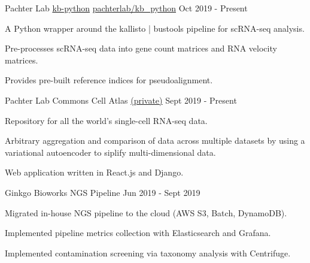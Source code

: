 

\begin{cventries}

\cventry
  {Pachter Lab} %
  {\href{https://github.com/pachterlab/kb_python}{kb-python}} %
  {\faGithub\phantom{a}\href{https://github.com/pachterlab/kb_python}{pachterlab/kb\_python}} %
  {Oct 2019 - Present} %
  {
    \begin{cvitems} %
      \item {A Python wrapper around the kallisto | bustools pipeline for scRNA-seq analysis.}
      \item {Pre-processes scRNA-seq data into gene count matrices and RNA velocity matrices.}
      \item {Provides pre-built reference indices for pseudoalignment.}
    \end{cvitems}
  }

\cventry
  {Pachter Lab} %
  {Commons Cell Atlas} %
  {\faGithub\phantom{a}\href{https://github.com/pachterlab/cca-webapp}{(private)}} %
  {Sept 2019 - Present} %
  {
    \begin{cvitems} %
      \item {Repository for all the world's single-cell RNA-seq data.}
      \item {Arbitrary aggregation and comparison of data across multiple datasets by using a variational autoencoder to siplify multi-dimensional data.}
      \item {Web application written in React.js and Django.}
    \end{cvitems}
  }

\cventry
    {Ginkgo Bioworks}
    {NGS Pipeline}
    {}
    {Jun 2019 - Sept 2019}
    {
     \begin{cvitems} %
       \item {Migrated in-house NGS pipeline to the cloud (AWS S3, Batch, DynamoDB).}
       \item {Implemented pipeline metrics collection with Elasticsearch and Grafana.}
       \item {Implemented contamination screening via taxonomy analysis with Centrifuge.}
      \end{cvitems}
    }


\end{cventries}
